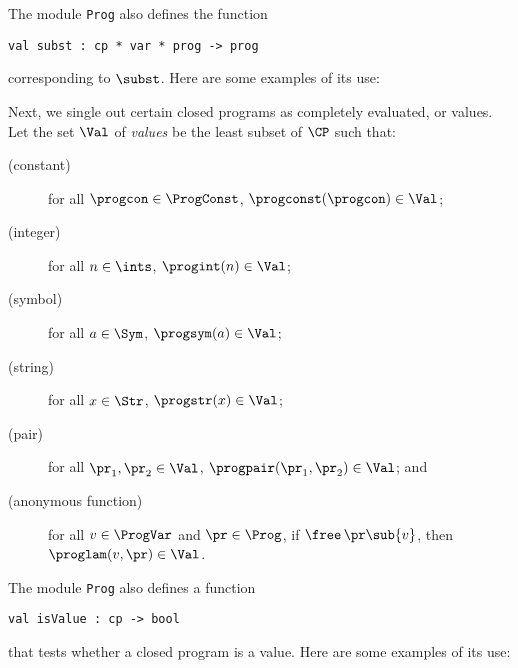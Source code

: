 The module \texttt{Prog} also defines the function
\begin{verbatim}
val subst : cp * var * prog -> prog
\end{verbatim}
corresponding to $\subst$.  Here are some examples of its use:


Next, we single out certain closed programs as completely evaluated,
or values.  Let the set $\Val$ of \emph{values} be the least subset of
$\CP$ such that:
\begin{description}
\item[\quad(constant)] for all $\progcon\in\ProgConst$,
  $\progconst(\progcon)\in\Val$;

\item[\quad(integer)] for all $n\in\ints$, $\progint(n)\in\Val$;

\item[\quad(symbol)] for all $a\in\Sym$, $\progsym(a)\in\Val$;

\item[\quad(string)] for all $x\in\Str$, $\progstr(x)\in\Val$;

\item[\quad(pair)] for all $\pr_1,\pr_2\in\Val$,
  $\progpair(\pr_1,\pr_2)\in\Val$; and

\item[\quad(anonymous function)] for all $v\in\ProgVar$ and
  $\pr\in\Prog$, if $\free\,\pr\sub\{v\}$, then
  $\proglam(v,\pr)\in\Val$.
\end{description}

The module \texttt{Prog} also defines a function
\begin{verbatim}
val isValue : cp -> bool
\end{verbatim}
that tests whether a closed program is a value.  Here are some
examples of its use:


